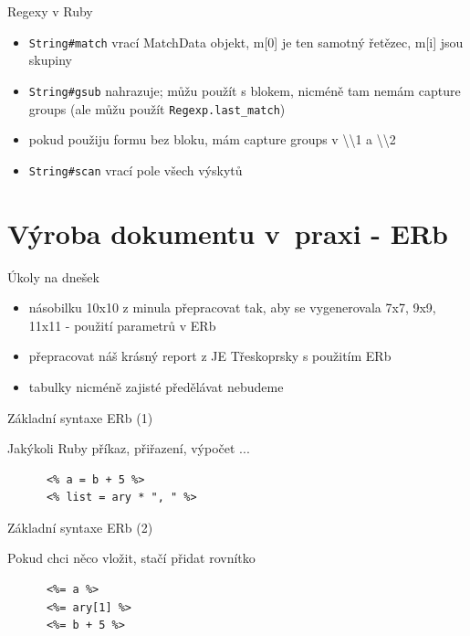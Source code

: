 \documentclass{beamer}
\begin{document}
\begin{frame}{Regexy v Ruby}
  \begin{itemize}
    \item \texttt{String\#match} vrací MatchData objekt, m[0] je ten samotný řetězec, m[i] jsou skupiny
    \item \texttt{String\#gsub} nahrazuje; můžu použít s blokem, nicméně tam nemám capture groups (ale můžu použít \texttt{Regexp.last\_match})
    \item pokud použiju formu bez bloku, mám capture groups v \textbackslash \textbackslash 1 a \textbackslash \textbackslash 2
    \item \texttt{String\#scan} vrací pole všech výskytů
  \end{itemize}
\end{frame}


\section{Výroba dokumentu v~praxi - ERb}

\begin{frame}{Úkoly na dnešek}
  \begin{itemize}
    \item násobilku 10x10 z minula přepracovat tak, aby se vygenerovala 7x7, 9x9, 11x11 - použití parametrů v ERb
    \item přepracovat náš krásný report z JE Třeskoprsky s použitím ERb 
    \item tabulky nicméně zajisté předělávat nebudeme
  \end{itemize}
\end{frame}

\begin{frame}[fragile]{Základní syntaxe ERb (1)}
  \begin{block}{ }
    Jakýkoli Ruby příkaz, přiřazení, výpočet ...
    \scriptsize
    \begin{verbatim}
      <% a = b + 5 %>
      <% list = ary * ", " %>
    \end{verbatim}
  \end{block}
\end{frame}

\begin{frame}[fragile]{Základní syntaxe ERb (2)}
  \begin{block}{ }
    Pokud chci něco vložit, stačí přidat rovnítko
    \scriptsize
    \begin{verbatim}
      <%= a %>
      <%= ary[1] %>
      <%= b + 5 %>
    \end{verbatim}
  \end{block}
\end{frame}
\end{document}
